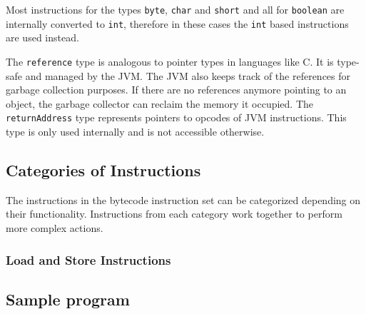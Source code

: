 Most instructions for the types \texttt{byte}, \texttt{char} and \texttt{short} and all for \texttt{boolean} are internally converted to \texttt{int}, therefore in these cases the \texttt{int} based instructions are used instead.

The \texttt{reference} type is analogous to pointer types in languages like C. It is type-safe and managed by the JVM. The JVM also keeps track of the references for garbage collection purposes. If there are no references anymore pointing to an object, the garbage collector can reclaim the memory it occupied. The \texttt{returnAddress} type represents pointers to opcodes of JVM instructions. This type is only used internally and is not accessible otherwise.


\subsection{Categories of Instructions}

The instructions in the bytecode instruction set can be categorized depending on their functionality. Instructions from each category work together to perform more complex actions. 

\subsubsection{Load and Store Instructions}


\subsection{Sample program}